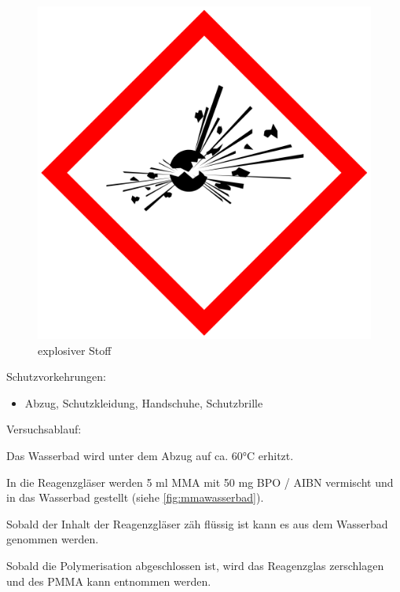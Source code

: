 \begin{figure}[h]
\begin{center}
\begin{minipage}[t]{0.25\textwidth}
\begin{center}
                \includegraphics[height=0.1\textheight]{Bilder/Optische_Wellenleiter_Die_Polymer_Optische_Faser/Material_Polycarbonat/bombe.png}
                \caption[explosiver Stoff \newline \url{https://de.wikipedia.org/wiki/Datei:GHS-pictogram-explos.svg} (zuletzt aufgerufen am 11.10.2015)]{explosiver Stoff}
                \label{fig:bombe}
            \end{center}
        \end{minipage}
    \end{center}
\end{figure}

Schutzvorkehrungen:
\begin{itemize}
    \item Abzug, Schutzkleidung, Handschuhe, Schutzbrille
\end{itemize}

Versuchsablauf:
\begin{enumerate*}
    \item Das Wasserbad wird unter dem Abzug auf ca. 60°C erhitzt.
    \item In die Reagenzgläser werden 5 ml MMA mit 50 mg BPO / AIBN vermischt und in das Wasserbad gestellt (siehe \autoref{fig:mmawasserbad}).
    \item Sobald der Inhalt der Reagenzgläser zäh flüssig ist kann es aus dem Wasserbad genommen werden.
    \item Sobald die Polymerisation abgeschlossen ist, wird das Reagenzglas zerschlagen und des PMMA kann entnommen werden.
\end{enumerate*}

